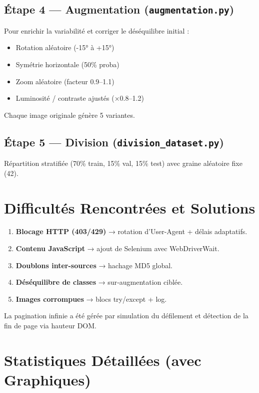 \documentclass[12pt,a4paper]{article}
\begin{document}
\subsection{Étape 4 — Augmentation (\texttt{augmentation.py})}
Pour enrichir la variabilité et corriger le déséquilibre initial :
\begin{itemize}[noitemsep]
  \item Rotation aléatoire (-15° à +15°)
  \item Symétrie horizontale (50\% proba)
  \item Zoom aléatoire (facteur 0.9–1.1)
  \item Luminosité / contraste ajustés (×0.8–1.2)
\end{itemize}
Chaque image originale génère 5 variantes.

\subsection{Étape 5 — Division (\texttt{division\_dataset.py})}
Répartition stratifiée (70\% train, 15\% val, 15\% test) avec graine aléatoire fixe (42).

\section{Difficultés Rencontrées et Solutions}
\begin{warnbox}
\begin{enumerate}[noitemsep]
  \item \textbf{Blocage HTTP (403/429)} → rotation d'User-Agent + délais adaptatifs.
  \item \textbf{Contenu JavaScript} → ajout de Selenium avec WebDriverWait.
  \item \textbf{Doublons inter-sources} → hachage MD5 global.
  \item \textbf{Déséquilibre de classes} → sur‑augmentation ciblée.
  \item \textbf{Images corrompues} → blocs try/except + log.
\end{enumerate}
\end{warnbox}
La pagination infinie a été gérée par simulation du défilement et détection de la fin de page via hauteur DOM.

\section{Statistiques Détaillées (avec Graphiques)}
\end{document}
